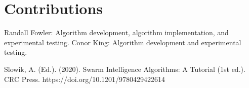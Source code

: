 \documentclass[sigconf,authordraft]{acmart}
\begin{document}
\section*{Contributions}
Randall Fowler: Algorithm development, algorithm implementation, and experimental testing. Conor King: Algorithm development and experimental testing.

\begin{thebibliography}{1}
    
    
    Slowik, A. (Ed.). (2020). Swarm Intelligence Algorithms: A Tutorial (1st ed.). CRC Press. https://doi.org/10.1201/9780429422614
    
    
\end{thebibliography}
\end{document}
